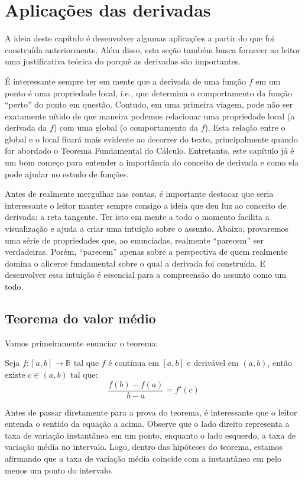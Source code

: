 
\chapter{Aplicações das derivadas}\label{cap:apl_derivadas}

\emconstrucao

A ideia deste capítulo é desenvolver algumas aplicações a partir do que foi construída anteriormente. Além disso, esta seção também busca fornecer ao leitor uma justificativa teórica do porquê as derivadas são importantes. 

	É interessante sempre ter em mente que a derivada de uma função $f$ em um ponto é uma propriedade local, i.e., que determina o comportamento da função ``perto'' do ponto em questão. Contudo, em uma primeira viagem, pode não ser exatamente nítido de que maneira podemos relacionar uma propriedade local (a derivada da $f$) com uma global (o comportamento da $f$). Esta relação entre o global e o local ficará mais evidente ao decorrer do texto, principalmente quando for abordado o Teorema Fundamental do Cálculo. Entretanto, este capítulo já é um bom começo para entender a importância do conceito de derivada e como ela pode ajudar no estudo de funções.
	
	Antes de realmente mergulhar nas contas, é importante destacar que seria interessante o leitor manter sempre consigo a ideia que deu luz ao conceito de derivada: a reta tangente. Ter isto em mente a todo o momento facilita a visualização e ajuda a criar uma intuição sobre o assunto. Abaixo, provaremos uma série de propriedades que, ao enunciadas, realmente ``parecem'' ser verdadeiras. Porém, ``parecem'' apenas sobre a perspectiva de quem realmente domina o alicerce fundamental sobre o qual a derivada foi construída. E desenvolver essa intuição é essencial para a compreensão do assunto como um todo.
 
\section{Teorema do valor médio}

\construirSec

	Vamos primeiramente enunciar o teorema:
	\begin{teo}
		Seja $f:[a,b]\to \mathbb{R}$ tal que $f$ é contínua em $[a,b]$ e derivável em $(a,b)$, então existe $c \in (a,b)$ tal que:
		$$\frac{f(b) - f(a)}{b - a} = f'(c)$$
	\end{teo}
	Antes de passar diretamente para a prova do teorema, é interessante que o leitor entenda o sentido da equação a acima. Observe que o lado direito representa a taxa de variação instantânea em um ponto, enquanto o lado esquerdo, a taxa de variação média no intervalo. Logo, dentro das hipóteses do teorema, estamos afirmando que a taxa de variação média coincide com a instantânea em pelo menos um ponto do intervalo. 
	
